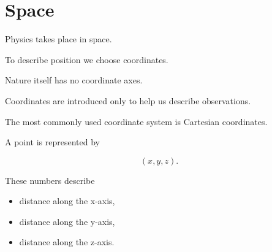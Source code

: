 \section{Space}

Physics takes place in space.

To describe position we choose coordinates.

Nature itself has no coordinate axes.

Coordinates are introduced only to help us describe observations.

The most commonly used coordinate system is Cartesian coordinates.

A point is represented by

\[
(x,y,z).
\]

These numbers describe

\begin{itemize}
	\item distance along the x-axis,
	\item distance along the y-axis,
	\item distance along the z-axis.
\end{itemize}

